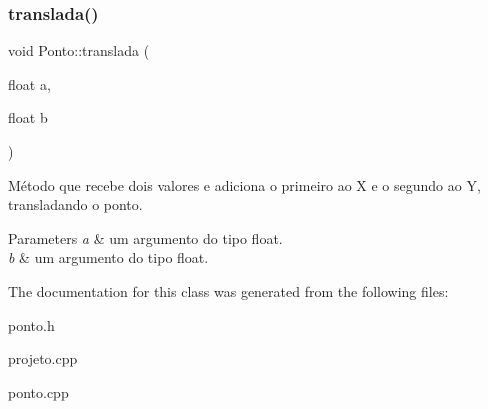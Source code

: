 \subsubsection{\texorpdfstring{translada()}{translada()}}
{\footnotesize\ttfamily void Ponto\+::translada (\begin{DoxyParamCaption}\item[{float}]{a,  }\item[{float}]{b }\end{DoxyParamCaption})\hspace{0.3cm}{\ttfamily [inline]}}



Método que recebe dois valores e adiciona o primeiro ao X e o segundo ao Y, transladando o ponto. 


\begin{DoxyParams}{Parameters}
{\em a} & um argumento do tipo float. \\
\hline
{\em b} & um argumento do tipo float. \\
\hline
\end{DoxyParams}


The documentation for this class was generated from the following files\+:\begin{DoxyCompactItemize}
\item 
ponto.\+h\item 
projeto.\+cpp\item 
ponto.\+cpp\end{DoxyCompactItemize}
